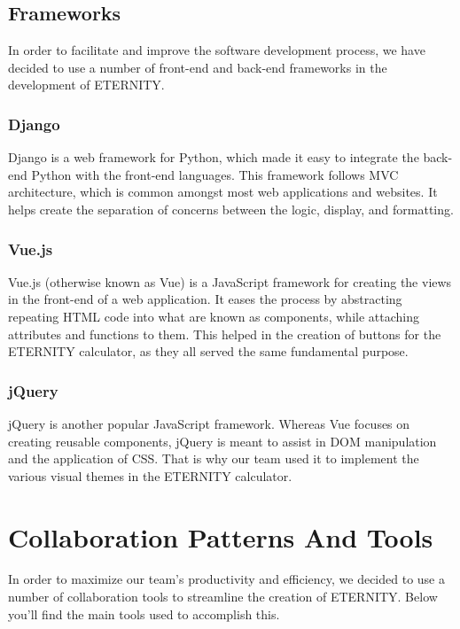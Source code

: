 \documentclass[11pt,onside]{report}
\begin{document}
\subsection{Frameworks}

In order to facilitate and improve the software development process, we have decided to use a number of front-end and back-end frameworks in the development of ETERNITY.

\subsubsection{Django}

Django is a web framework for Python, which made it easy to integrate the back-end Python with the front-end languages. This framework follows MVC architecture, which is common amongst most web applications and websites. It helps create the separation of concerns between the logic, display, and formatting. \cite{django}

\subsubsection{Vue.js}

Vue.js (otherwise known as Vue) is a JavaScript framework for creating the views in the front-end of a web application. It eases the process by abstracting repeating HTML code into what are known as components, while attaching attributes and functions to them. This helped in the creation of buttons for the ETERNITY calculator, as they all served the same fundamental purpose. \cite{vue.js}

\subsubsection{jQuery}

jQuery is another popular JavaScript framework. Whereas Vue focuses on creating reusable components, jQuery is meant to assist in DOM manipulation and the application of CSS. That is why our team used it to implement the various visual themes in the ETERNITY calculator. \cite{jquery}




\section{Collaboration Patterns And Tools}
In order to maximize our team's productivity and efficiency, we decided to use a number of collaboration tools to streamline the creation of ETERNITY. Below you'll find the main tools used to accomplish this.
\end{document}
